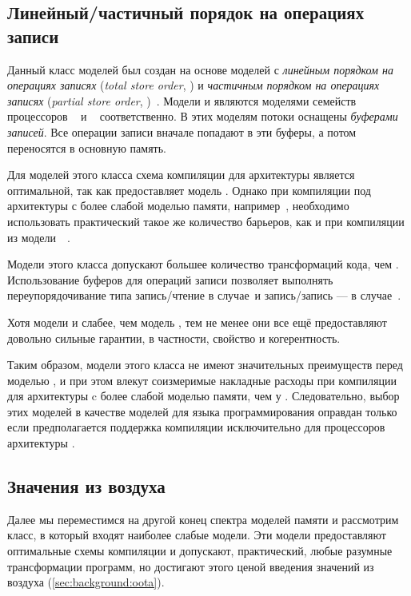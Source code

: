 \subsection{Линейный/частичный порядок на операциях записи}
\label{sec:analysis:tso}

Данный  класс моделей был создан на основе моделей с 
\emph{линейным порядком на операциях записях} (\emph{total store order}, \TSO)
и \emph{частичным порядком на операциях записях} (\emph{partial store order}, \PSO)~\cite{Sparc:94}.
Модели \TSO и \PSO являются моделями семейств процессоров \Intel~\cite{Sewell-al:CACM10} 
и \SPARC~\cite{Sparc:94} соответственно. 
В этих моделям потоки оснащены \emph{буферами записей}.
Все операции записи вначале попадают в эти буферы, а потом переносятся в основную память. 

Для моделей этого класса схема компиляции для архитектуры \Intel 
является оптимальной, так как \Intel предоставляет модель \TSO.
Однако при компиляции под архитектуры с более слабой моделью памяти, 
например~\POWER, необходимо использовать практический такое же 
количество барьеров, как и при компиляции из модели~\SC~\cite{Lustig-al:AISCA15}.

Модели этого класса допускают большее количество трансформаций кода, чем \SC.
Использование буферов для операций записи позволяет выполнять переупорядочивание 
типа запись/чтение в случае~\TSO и  запись/запись --- в случае~\PSO.

Хотя модели \TSO и \PSO слабее, чем модель \SC, 
тем не менее они все ещё предоставляют довольно сильные гарантии, 
в частности, свойство \eDRF и когерентность.

Таким образом, модели этого класса не имеют 
значительных преимуществ перед моделью \SC, 
и при этом влекут соизмеримые накладные расходы 
при компиляции для архитектуры c более слабой моделью памяти, чем у \Intel. 
Следовательно, выбор этих моделей в качестве моделей для 
языка программирования оправдан только если предполагается 
поддержка компиляции исключительно для процессоров архитектуры \Intel. 

\subsection{Значения из воздуха}
\label{sec:analysis:oota}

Далее мы переместимся на другой конец спектра моделей памяти
и рассмотрим класс, в который входят наиболее слабые модели. 
Эти модели предоставляют оптимальные схемы компиляции и 
допускают, практический, любые разумные трансформации программ, 
но достигают этого ценой введения значений из воздуха 
(\cref{sec:background:oota}).

